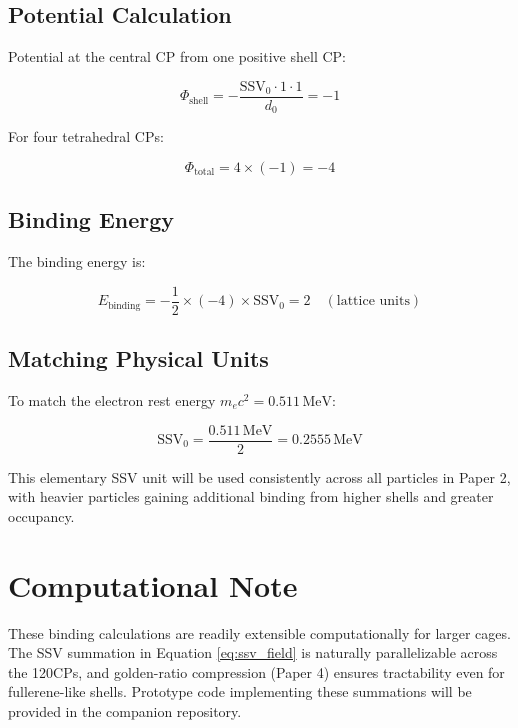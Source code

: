 \documentclass[11pt]{article}
\begin{document}
\subsection{Potential Calculation}
Potential at the central CP from one positive shell CP:

\begin{equation}
\Phi_{\text{shell}} = - \frac{\text{SSV}_0 \cdot 1 \cdot 1}{d_0} = -1
\end{equation}

For four tetrahedral CPs:

\begin{equation}
\Phi_{\text{total}} = 4 \times (-1) = -4
\end{equation}

\subsection{Binding Energy}
The binding energy is:

\begin{equation}
E_{\text{binding}} = -\frac{1}{2} \times (-4) \times \text{SSV}_0 = 2 \quad (\text{lattice units})
\label{eq:electron_binding_lattice}
\end{equation}

\subsection{Matching Physical Units}
To match the electron rest energy $m_e c^2 = 0.511 \, \text{MeV}$:

\begin{equation}
\text{SSV}_0 = \frac{0.511 \, \text{MeV}}{2} = 0.2555 \, \text{MeV}
\label{eq:ssv0_value}
\end{equation}

This elementary SSV unit will be used consistently across all particles in Paper 2, with heavier particles gaining additional binding from higher shells and greater occupancy.

\section{Computational Note}

These binding calculations are readily extensible computationally for larger cages. The SSV summation in Equation \eqref{eq:ssv_field} is naturally parallelizable across the 120CPs, and golden-ratio compression (Paper 4) ensures tractability even for fullerene-like shells. Prototype code implementing these summations will be provided in the companion repository.
\end{document}
